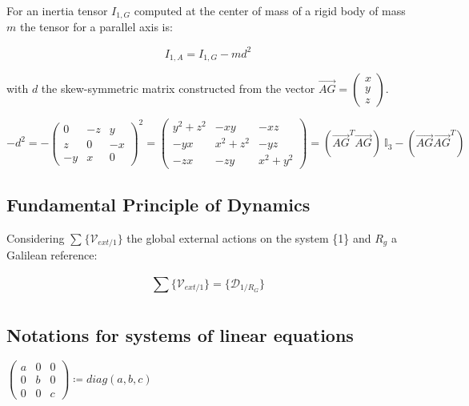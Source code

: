 \documentclass[\main/main.tex]{subfiles}
\begin{document}
For an inertia tensor $I_{1, G}$ computed at the center of mass of a rigid body of mass $m$ the tensor for a parallel axis is:

\begin{equation}
 \label{eq:appendix:notation:parallel_axis}
 I_{1, A} = I_{1, G} - m d^2
\end{equation}

with $d$ the skew-symmetric matrix constructed from the vector $\overrightarrow{AG} = \begin{pmatrix}
x \\
y \\
z
\end{pmatrix}$.

{\centering
 $ -d^2 = -\begin{pmatrix}
 0 & -z & y \\
 z & 0 & -x \\
 -y & x & 0
 \end{pmatrix}^2
 = \begin{pmatrix}
 y^2 + z^2 & -xy & -xz \\
 -yx & x^2 + z^2 & -yz \\
 -zx & -zy & x^2 + y^2
 \end{pmatrix}
 = (\overrightarrow{AG}^T \overrightarrow{AG}) \ \mathbb{I}_3 - (\overrightarrow{AG} \overrightarrow{AG}^T)$
 \par}


\subsection{Fundamental Principle of Dynamics}

Considering $\sum_{}^{} \{ \mathcal{V}_{ext/1} \}$ the global external actions on the system \{1\} and $R_g$ a Galilean reference:

\begin{equation}
 \sum_{}^{} \{ \mathcal{V}_{ext/1} \} = \{ \mathcal{D}_{1/R_G} \}
 \label{appendix:notation:fpd}
\end{equation}


\subsection{Notations for systems of linear equations}
\label{notation:matrix}
{\centering
 $ \begin{pmatrix}
  a & 0 & 0 \\
  0 & b & 0 \\
  0 & 0 & c
 \end{pmatrix}
 \coloneqq diag(a, b, c)$
 \par}
\end{document}
